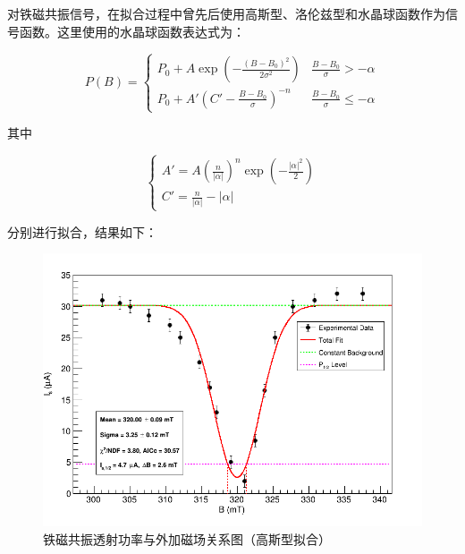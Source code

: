 \documentclass{thuemp}
\begin{document}
    对铁磁共振信号，在拟合过程中曾先后使用高斯型、洛伦兹型和水晶球函数作为信号函数。这里使用的水晶球函数表达式为：
    
        
    
    \begin{equation}
        P(B) = 
        \begin{cases}
            P_0 + A \exp\left( -\frac{(B - B_0)^2}{2\sigma^2} \right) & \frac{B - B_0}{\sigma} > -\alpha \\
            P_0 + A' \left( C' -\frac{B-B_0}{\sigma} \right)^{-n} & \frac{B - B_0}{\sigma} \leq -\alpha
        \end{cases}
        \label{eq:crystalball}
    \end{equation}
    
    其中
    
    \begin{equation}
        \begin{cases}
            A' = A \left( \frac n {|\alpha|}\right)^n \exp \left(-\frac{|\alpha|^2} 2\right) \\
        C' = \frac n {|\alpha|} - |\alpha|
        \end{cases}
    \end{equation}

    分别进行拟合，结果如下：

    \begin{figure}[H]
        \centering
        \includegraphics[width=0.9\linewidth]{../Data/FMR_ConstantBg_GaussPeak.png}
        \caption{铁磁共振透射功率与外加磁场关系图（高斯型拟合）} \label{fig:FMR_Gauss}
    \end{figure}
\end{document}
